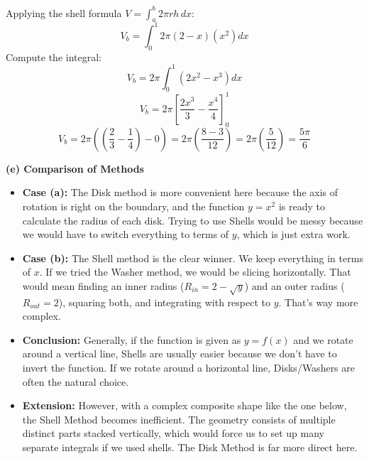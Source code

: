 Applying the shell formula $V = \int_{a}^{b} 2\pi r h \, dx$:
\[ V_b = \int_{0}^{1} 2\pi (2-x)(x^2) dx \]
Compute the integral:
\[ V_b = 2\pi \int_{0}^{1} (2x^2 - x^3) dx \]
\[ V_b = 2\pi \left[ \frac{2x^3}{3} - \frac{x^4}{4} \right]_{0}^{1} \]
\[ V_b = 2\pi \left( \left(\frac{2}{3} - \frac{1}{4}\right) - 0 \right) = 2\pi \left( \frac{8-3}{12} \right) = 2\pi \left(\frac{5}{12}\right) = \boxed{\frac{5\pi}{6}} \]

\textbf{(e) Comparison of Methods}
\begin{itemize}
    \item \textbf{Case (a):} The Disk method is more convenient here because the axis of rotation is right on the boundary, and the function $y=x^2$ is ready to calculate the radius of each disk. Trying to use Shells would be messy because we would have to switch everything to terms of $y$, which is just extra work.
    \item \textbf{Case (b):} The Shell method is the clear winner. We keep everything in terms of $x$. If we tried the Washer method, we would be slicing horizontally. That would mean finding an inner radius ($R_{in} = 2-\sqrt{y}$) and an outer radius ($R_{out} = 2$), squaring both, and integrating with respect to $y$. That's way more complex.
    \item \textbf{Conclusion:} Generally, if the function is given as $y=f(x)$ and we rotate around a vertical line, Shells are usually easier because we don't have to invert the function. If we rotate around a horizontal line, Disks/Washers are often the natural choice.
    \item \textbf{Extension:} However, with a complex composite shape like the one below, the Shell Method becomes inefficient. The geometry consists of multiple distinct parts stacked vertically, which would force us to set up many separate integrals if we used shells. The Disk Method is far more direct here.
\end{itemize}
